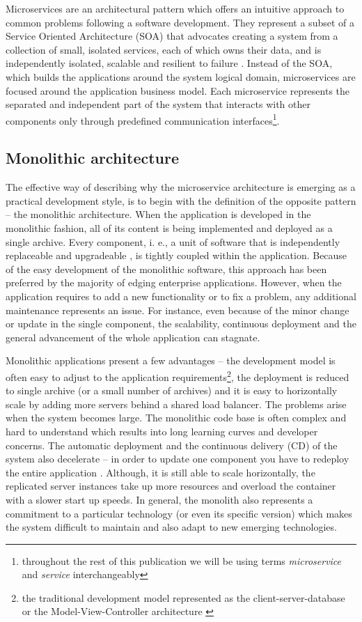 \documentclass[oneside,
  digital, %
  table,   %
  nolof,     %
  nolot,     %
]{fithesis3}
\begin{document}
Microservices are an architectural pattern which offers an intuitive approach to common problems following a software development. They represent a subset of a Service Oriented Architecture (SOA) \cite{soa} that advocates creating a system from a collection of small, isolated services, each of which owns their data, and is independently isolated, scalable and resilient to failure \cite{reactive_ms_arch}. Instead of the SOA, which builds the applications around the system logical domain, microservices are focused around the application business model. Each microservice represents the separated and independent part of the system that interacts with other components only through predefined communication interfaces\footnote{throughout the rest of this publication we will be using terms \textit{microservice} and \textit{service} interchangeably}.

\subsection{Monolithic architecture}

The effective way of describing why the microservice architecture is emerging as a practical development style, is to begin with the definition of the opposite pattern -- the monolithic architecture. When the application is developed in the monolithic fashion, all of its content is being implemented and deployed as a single archive. Every component, i. e., a unit of software that is independently replaceable and upgradeable \cite{microservices}, is tightly coupled within the application. Because of the easy development of the monolithic software, this approach has been preferred by the majority of edging enterprise applications. However, when the application requires to add a new functionality or to fix a problem, any additional maintenance represents an issue. For instance, even because of the minor change or update in the single component, the scalability, continuous deployment and the general advancement of the whole application can stagnate. 

Monolithic applications present a few advantages -- the development model is often easy to adjust to the application requirements\footnote{the traditional development model represented as the client-server-database or the Model-View-Controller architecture \cite{mvn_architecture}}, the deployment is reduced to single archive (or a small number of archives) and it is easy to horizontally scale by adding more servers behind a shared load balancer. The problems arise when the system becomes large. The monolithic code base is often complex and hard to understand which results into long learning curves \cite{learning_curve} and developer concerns. The automatic deployment and the continuous delivery (CD) of the system also decelerate -- in order to update one component you have to redeploy the entire application \cite{monolithic_arch}. Although, it is still able to scale horizontally, the replicated server instances take up more resources and overload the container with a slower start up speeds. In general, the monolith also represents a commitment to a particular technology (or even its specific version) which makes the system difficult to maintain and also adapt to new emerging technologies.
\end{document}
